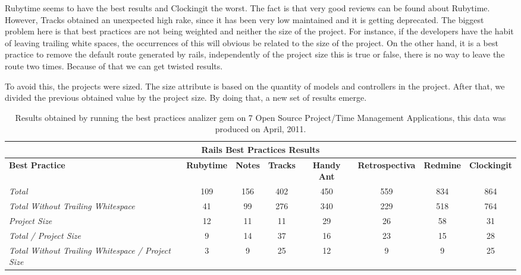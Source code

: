 \documentclass[sle]{llncs}
\begin{document}
Rubytime seems to have the best results and Clockingit the worst. The fact is that very good reviews can be found about Rubytime.
However, Tracks obtained an unexpected high rake, since it has been very low maintained and it is getting deprecated.
The biggest problem here is that best practices are not being weighted and neither the size of the project. 
For instance, if the developers have the habit of leaving trailing white spaces, the occurrences of this will obvious be related to the size of the project.
On the other hand, it is a best practice to remove the default route generated by rails, independently of the project size this is true or false, 
there is no way to leave the route two times. Because of that we can get twisted results.

To avoid this, the projects were sized.
The size attribute is based on the quantity of models and controllers in the project. 
After that, we divided the previous obtained value by the project size.
By doing that, a new set of results emerge.

\begin{table}[H]
\begin{center}
{\scriptsize
\begin{threeparttable}
\begin{tabular}{|l||c|c|c|c|c|c|c|} \hline 
\multicolumn{8}{|c|}{Rails Best Practices Results} \\ \hline 
\textbf{Best Practice}& \textbf{Rubytime}& \textbf{Notes}& \textbf{Tracks}&  \textbf{Handy Ant}& \textbf{Retrospectiva}& \textbf{Redmine}& \textbf{Clockingit} \\\hline\hline
\emph{Total                                           }              & 109  & 156  & 402  & 450 & 559 & 834 & 864  \\ \hline 
\emph{Total Without Trailing Whitespace               }              &  41  &  99  & 276  & 340 & 229 & 518 & 764  \\ \hline 
\emph{Project Size                                    }              &  12  &  11  &  11  &  29 &  26 &  58 &  31  \\ \hline 
\emph{Total / Project Size                            }              &   9  &  14  &  37  &  16 &  23 &  15 &  28  \\ \hline 
\emph{Total Without Trailing Whitespace / Project Size}              &   3  &   9  &  25  &  12 &   9 &   9 &  25  \\ \hline 
\end{tabular}
\end{threeparttable}
}
\end{center}
\caption{Results obtained by running the best practices analizer gem on 7 Open Source Project/Time Management Applications, this data was produced on April, 2011.}
\label{table:OSPHWebSites}
\end{table}
\end{document}
